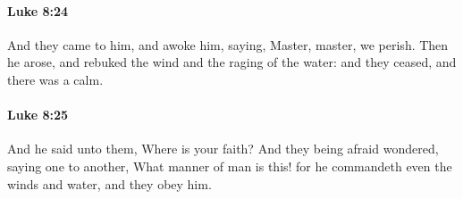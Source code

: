 		\paragraph{Luke 8:24} %
			\label{LUKE-8-24}

			And they came to him, and awoke him, saying, Master, master, we perish. Then he arose, and rebuked the wind and the raging of the water: and they ceased, and there was a calm.

			\begin{framed}
			\scriptsize
				\begin{compactdesc}
					\item[SBLG] 
				\end{compactdesc}
			\end{framed}

		\paragraph{Luke 8:25} %
			\label{LUKE-8-25}

			And he said unto them, Where is your faith? And they being afraid wondered, saying one to another, What manner of man is this! for he commandeth even the winds and water, and they obey him.


